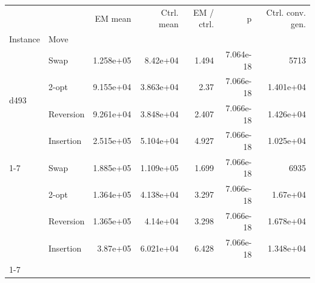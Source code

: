\begin{tabular}{llrrrrr}
\toprule
 &  & EM mean & Ctrl. mean & EM / ctrl. & p & Ctrl. conv. gen. \\
Instance & Move &  &  &  &  &  \\
\midrule
\multirow[t]{4}{*}{d493} & Swap & 1.258e+05 & 8.42e+04 & 1.494 & 7.064e-18 & 5713 \\
 & 2-opt & 9.155e+04 & 3.863e+04 & 2.37 & 7.066e-18 & 1.401e+04 \\
 & Reversion & 9.261e+04 & 3.848e+04 & 2.407 & 7.066e-18 & 1.426e+04 \\
 & Insertion & 2.515e+05 & 5.104e+04 & 4.927 & 7.066e-18 & 1.025e+04 \\
\cline{1-7}
\multirow[t]{4}{*}{u574} & Swap & 1.885e+05 & 1.109e+05 & 1.699 & 7.066e-18 & 6935 \\
 & 2-opt & 1.364e+05 & 4.138e+04 & 3.297 & 7.066e-18 & 1.67e+04 \\
 & Reversion & 1.365e+05 & 4.14e+04 & 3.298 & 7.066e-18 & 1.678e+04 \\
 & Insertion & 3.87e+05 & 6.021e+04 & 6.428 & 7.066e-18 & 1.348e+04 \\
\cline{1-7}
\bottomrule
\end{tabular}
